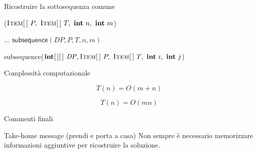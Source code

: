 \begin{frame}[shrink=10]{Ricostruire la sottosequenza comune}

\vspace{-12pt}
\begin{Procedure}
\caption[A]{\INTEGER \LCS($\Item[\,]\ P,\ \Item[\,]\ T,\ \INTEGER\ n,\ \INTEGER\ m$)}
  $\ldots$\;
  \Return $\textsf{subsequence}(\mathit{DP}, P, T, n, m)$\;
\end{Procedure}

\vspace{-18pt}
\begin{Procedure}
\caption[A]{\textsf{subsequence}($\INTEGER[\,][\,]\ \mathit{DP}, \Item[\,]\ P,\ \Item[\,]\ T,\ \INTEGER\ i,\ \INTEGER\ j$)}
\end{Procedure}


\end{frame}

\begin{frame}{Complessità computazionale}


\pause
\[
  T(n) = O(m+n)
\]
  
\bigskip
{}

\pause
\[
  T(n) = O(mn)
\]

\end{frame}

\begin{frame}{Commenti finali}

\begin{block}{Take-home message (prendi e porta a casa)}
Non sempre è necessario memorizzare informazioni aggiuntive per ricostruire la soluzione.
\end{block}

\end{frame}

